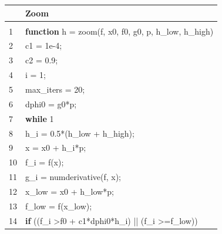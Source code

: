 \documentclass[bosnian,12pt,a4paper]{report}
\begin{document}
\begin{tabular}{ll}
   & Zoom                                                                       \\ \hline \\
1  & \textbf{function} h = zoom(f, x0, f0, g0, p, h\_low, h\_high)                          \\
2  & \hspace*{1cm}c1 = 1e-4;                                                                 \\
3  & \hspace*{1cm}c2 = 0.9;                                                                  \\
4  & \hspace*{1cm}i = 1;                                                                     \\
5  & \hspace*{1cm}max\_iters = 20;                                                           \\
6  & \hspace*{1cm}dphi0 = g0*p;                                                              \\
7  & \hspace*{1cm}\textbf{while} 1                                                                    \\
8  & \hspace*{2cm}h\_i = 0.5*(h\_low + h\_high);                                                 \\
9 & \hspace*{2cm}x = x0 + h\_i*p;                                                           \\
10 & \hspace*{2cm}f\_i = f(x);                                                               \\
11 & \hspace*{2cm}g\_i = numderivative(f, x);                                                \\
12 & \hspace*{2cm}x\_low = x0 + h\_low*p;                                                      \\
13 & \hspace*{2cm}f\_low = f(x\_low);                                                          \\
14 & \hspace*{2cm}\textbf{if} ((f\_i \textgreater f0 + c1*dphi0*h\_i) || (f\_i \textgreater{}=f\_low)) \\

\end{tabular}
\end{document}
